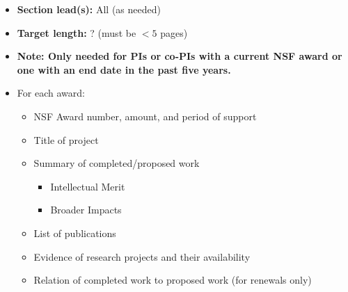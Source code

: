 \documentclass[10pt]{myNSF}
\begin{document}
\begin{itemize}
\item{\textbf{Section lead(s):} All (as needed)}
\item{\textbf{Target length:} ? (must be $< 5$ pages)}
\item{\textbf{Note: Only needed for PIs or co-PIs with a current NSF
      award or one with an end date in the past five years.}}
\item{For each award:}
  \begin{itemize}
  \item{NSF Award number, amount, and period of support}
  \item{Title of project}
  \item{Summary of completed/proposed work}
    \begin{itemize}
    \item{Intellectual Merit}
    \item{Broader Impacts}
    \end{itemize}
  \item{List of publications}
  \item{Evidence of research projects and their availability}
  \item{Relation of completed work to proposed work (for renewals
      only)}
  \end{itemize}
\end{itemize}

{}

\end{document}
